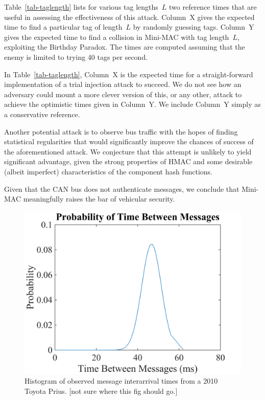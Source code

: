 Table~\ref{tab-taglength} lists for various tag lengths~$L$
two reference times that are useful in assessing the effectiveness of this attack.
Column~X gives the expected time to find a particular tag of length~$L$ by
randomly guessing tags.
Column~Y gives the expected time to find a collision in Mini-MAC with tag length~$L$,
exploiting the Birthday Paradox.  
The times are computed assuming that the enemy is limited to trying 40 tags per second.

In Table~\ref{tab-taglength}, Column~X is the expected time for a straight-forward 
implementation of a trial injection attack to succeed.  We do not see how an adversary
could mount a more clever version of this, or any other, attack to achieve
the optimistic times given in Column~Y.  We include Column~Y simply as a
conservative reference.

Another potential attack is to observe bus traffic with the hopes of finding statistical
regularities that would significantly improve the chances of success of the aforementioned attack.
We conjecture that this attempt is unlikely to yield significant advantage, given the
strong properties of HMAC and some
desirable (albeit imperfect) characteristics of the component hash functions.

Given that the CAN bus does not authenticate messages, we conclude that Mini-MAC
meaningfully raises the bar of vehicular security.

	\selectfont
	\begin{figure}
		\centering
		\includegraphics[width=\columnwidth]{figures/pdf.png}
		\caption{{\selectfont Histogram 
		of observed message interarrival times from a 2010 Toyota Prius. [not sure where this fig should go.]}}
		\label{fig-msgdelay}
	\end{figure}
	
